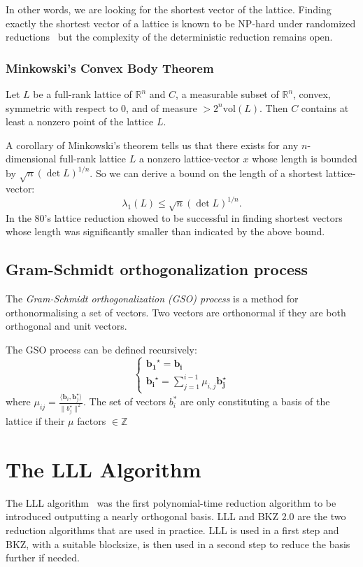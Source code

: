 \documentclass[10pt, a4paper]{article}
\renewcommand{\vec}[1]{\mathbf{#1}}
\begin{document}
In other words, we are looking for the shortest vector of the lattice. Finding exactly the shortest vector of a lattice is known to be NP-hard under randomized reductions~\cite{Ajtai:1998:SVP} but the complexity of the deterministic reduction remains open.

\subsubsection{Minkowski's Convex Body Theorem}
Let $L$ be a full-rank lattice of $\mathbb{R}^n$ and $C$, a measurable subset of $\mathbb{R}^n$, convex, symmetric with respect to 0, and of measure $> 2^n \text{vol}(L)$. Then $C$ contains at least a nonzero point of the lattice $L$.

A corollary of Minkowski's theorem tells us that there exists for any $n$-dimensional full-rank lattice $L$ a nonzero lattice-vector $x$ whose length is bounded by $\sqrt{n} (\det L)^{1/n}$. So we can derive a bound on the length of a shortest lattice-vector:
\[
\lambda_1(L) \leq \sqrt{n} (\det L)^{1/n}.
\]
In the 80's lattice reduction showed to be successful in finding shortest vectors whose length was significantly smaller than indicated by the above bound.

\subsection{Gram-Schmidt orthogonalization process}
The \emph{Gram-Schmidt orthogonalization (\emph GSO) process} is a method for orthonormalising a set of vectors. Two vectors are orthonormal if they are both orthogonal and unit vectors. 

The GSO process  can be defined recursively:
\[
\begin{cases}
\vec{b_1}^{\star} = \vec{b_i}  \\
\vec{b_i}^{\star} = \displaystyle\sum^{i-1}_{j=1} \mu_{i,j} \vec{b_j^\star}
\end{cases}
\]
where $\mu_{ij} = \frac{\langle \vec{b}_i, \vec{b}_j^\star \rangle}{\| b_j^\star\|^2}$. The set of vectors $b_i^*$ are only constituting a basis of the lattice if their $\mu$ factors $\in \mathbb{Z}$

\section{The LLL Algorithm}

The LLL algorithm~\cite{lllpaper} was the first polynomial-time reduction algorithm to be introduced outputting a nearly orthogonal basis. LLL and BKZ 2.0 are the two reduction algorithms that are used in practice. LLL is used in a first step and BKZ, with a suitable blocksize, is then used in a second step to reduce the basis further if needed.
\end{document}
